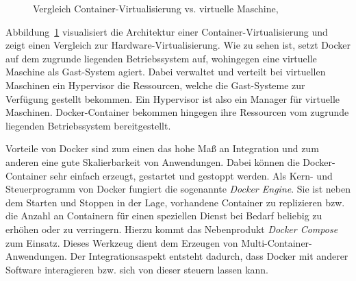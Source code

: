 \begin{figure}[h]
	\centering
	\captionsetup{justification=centering, format=plain}
	\hspace{1cm}
	\caption[Vergleich Container-Virtualisierung vs. virtuelle Maschine]{\label{fig:docker_container}Vergleich Container-Virtualisierung vs. virtuelle Maschine, \\\quelle \cite{MS-DockerInc..05.03.2019}}
\end{figure}

Abbildung~\ref{fig:docker_container} visualisiert die Architektur einer Container-Virtualisierung und zeigt einen Vergleich zur Hardware-Virtualisierung.\autocite[Vgl.][]{MS-ChrissiKraus.27.07.2018}\autocite[Vgl.][]{MS-MicrosoftCorporation.31.08.2018}
Wie zu sehen ist, setzt Docker auf dem zugrunde liegenden Betriebssystem auf, wohingegen eine virtuelle Maschine als Gast-System agiert.
Dabei verwaltet und verteilt bei virtuellen Maschinen ein Hypervisor die Ressourcen, welche die Gast-Systeme zur Verfügung gestellt bekommen.
Ein Hypervisor ist also ein Manager für virtuelle Maschinen.\autocite[Vgl.][]{MS-ReneBust.06.04.2010}
Docker-Container bekommen hingegen ihre Ressourcen vom zugrunde liegenden Betriebssystem bereitgestellt.

Vorteile von Docker sind zum einen das hohe Maß an Integration und zum anderen eine gute Skalierbarkeit von Anwendungen.
Dabei können die Docker-Container sehr einfach erzeugt, gestartet und gestoppt werden.
Als Kern- und Steuerprogramm von Docker fungiert die sogenannte \emph{Docker Engine}.
Sie ist neben dem Starten und Stoppen in der Lage, vorhandene Container zu replizieren bzw. die Anzahl an Containern für einen speziellen Dienst bei Bedarf beliebig zu erhöhen oder zu verringern.
Hierzu kommt das Nebenprodukt \emph{Docker Compose} zum Einsatz.
Dieses Werkzeug dient dem Erzeugen von Multi-Container-Anwendungen.
Der Integrationsaspekt entsteht dadurch, dass Docker mit anderer Software interagieren bzw. sich von dieser steuern lassen kann.\autocite[Vgl.][]{MS-Docker-Compose}
